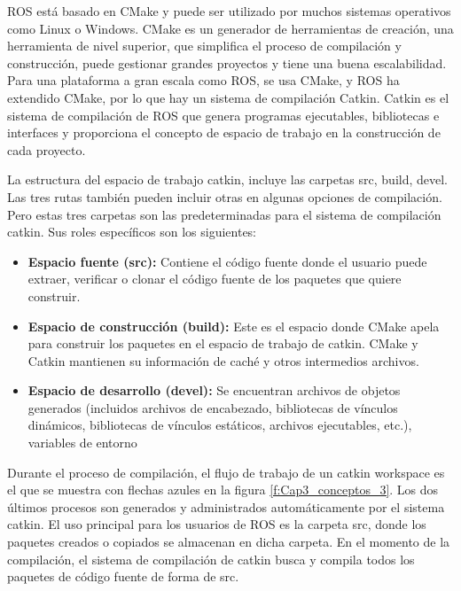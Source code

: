                \newpage
               
            ROS está basado en CMake y puede ser utilizado por muchos sistemas operativos como Linux o Windows. CMake es un generador de herramientas de creación, una herramienta de nivel superior, que simplifica el proceso de compilación y construcción, puede gestionar grandes proyectos y tiene una buena escalabilidad. Para una plataforma a gran escala como ROS, se usa CMake, y ROS ha extendido CMake, por lo que hay un sistema de compilación Catkin. Catkin es el sistema de compilación de ROS que genera programas ejecutables, bibliotecas e interfaces y proporciona el concepto de espacio de trabajo en la construcción de cada proyecto.
            
            La estructura del espacio de trabajo catkin, incluye las carpetas src, build, devel. Las tres rutas también pueden incluir otras en algunas opciones de compilación. Pero estas tres carpetas son las predeterminadas para el sistema de compilación catkin. Sus roles específicos son los siguientes:

            \begin{itemize}
                \item {\textbf{Espacio fuente (src):} Contiene el código fuente donde el usuario puede extraer, verificar o clonar el código fuente de los paquetes que quiere construir.}
                \item {\textbf{Espacio de construcción (build):} Este es el espacio donde CMake apela para construir los paquetes en el espacio de trabajo de catkin. CMake y Catkin mantienen su información de caché y otros intermedios archivos.}
                \item {\textbf{Espacio de desarrollo (devel):} Se encuentran archivos de objetos generados (incluidos archivos de encabezado, bibliotecas de vínculos dinámicos, bibliotecas de vínculos estáticos, archivos ejecutables, etc.), variables de entorno}
            \end{itemize}


            Durante el proceso de compilación, el flujo de trabajo de un catkin workspace es el que se muestra con flechas azules en la figura \eqref{f:Cap3_conceptos_3}. Los dos últimos procesos son generados y administrados automáticamente por el sistema catkin. El uso principal para los usuarios de ROS es la carpeta src\/, donde los paquetes creados o copiados se almacenan en dicha carpeta. En el momento de la compilación, el sistema de compilación de catkin busca y compila todos los paquetes de código fuente de forma de src\/.

